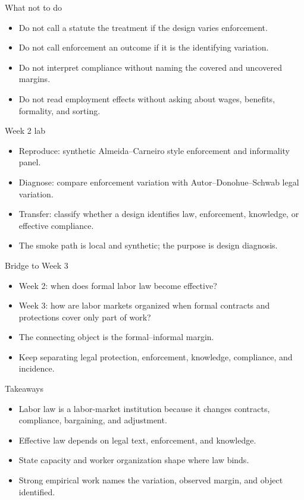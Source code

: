 \documentclass[aspectratio=169,11pt]{beamer}
\begin{document}
\begin{frame}{What not to do}
\begin{itemize}
    \item Do not call a statute the treatment if the design varies enforcement.
    \item Do not call enforcement an outcome if it is the identifying variation.
    \item Do not interpret compliance without naming the covered and uncovered margins.
    \item Do not read employment effects without asking about wages, benefits, formality, and sorting.
\end{itemize}
\end{frame}

\begin{frame}{Week 2 lab}
\begin{itemize}
    \item Reproduce: synthetic Almeida--Carneiro style enforcement and informality panel.
    \item Diagnose: compare enforcement variation with Autor--Donohue--Schwab legal variation.
    \item Transfer: classify whether a design identifies law, enforcement, knowledge, or effective compliance.
    \item The smoke path is local and synthetic; the purpose is design diagnosis.
\end{itemize}
\end{frame}

\begin{frame}{Bridge to Week 3}
\begin{itemize}
    \item Week 2: when does formal labor law become effective?
    \item Week 3: how are labor markets organized when formal contracts and protections cover only part of work?
    \item The connecting object is the formal--informal margin.
    \item Keep separating legal protection, enforcement, knowledge, compliance, and incidence.
\end{itemize}
\end{frame}

\begin{frame}{Takeaways}
\begin{itemize}
    \item Labor law is a labor-market institution because it changes contracts, compliance, bargaining, and adjustment.
    \item Effective law depends on legal text, enforcement, and knowledge.
    \item State capacity and worker organization shape where law binds.
    \item Strong empirical work names the variation, observed margin, and object identified.
\end{itemize}
\end{frame}
\end{document}
